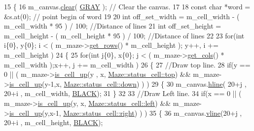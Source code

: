 \begin{DoxyCode}
15 \{
16     m\_canvas.\hyperlink{classCanvas_a0205269b201aed71f21b8f613cd66333}{clear}( \hyperlink{render_8cpp_a009fdb656a368e46b7d614e7438b5830}{GRAY} );     \textcolor{comment}{// Clear the canvas.}
17 
18     \textcolor{keyword}{const} \textcolor{keywordtype}{char} *word = &s.at(0); \textcolor{comment}{// point begin of word}
19 
20     \textcolor{keywordtype}{int} off\_set\_width = m\_cell\_width - ( m\_cell\_width * 95 ) / 100;      \textcolor{comment}{//Distance of lines}
21     \textcolor{keywordtype}{int} off\_set\_height = m\_cell\_height - ( m\_cell\_height * 95 ) / 100;   \textcolor{comment}{//Distance of lines}
22 
23     \textcolor{keywordflow}{for}(\textcolor{keywordtype}{int} i\{0\}, y\{0\}; i < ( m\_maze->\hyperlink{classMaze_ac786606a34632b2254b2d27d5f5f0f3f}{get\_rows}() * m\_cell\_height ); y++, i += m\_cell\_height )
24     \{
25         \textcolor{keywordflow}{for}(\textcolor{keywordtype}{int} j\{0\}, x\{0\}; j < ( m\_maze->\hyperlink{classMaze_a8a04cd1335e96a80358181afa164d4c9}{get\_cols}() * m\_cell\_width );x++, j += m\_cell\_width )
26         \{
27             \textcolor{comment}{//Draw top line.}
28             \textcolor{keywordflow}{if}(y == 0 || ( m\_maze->\hyperlink{classMaze_a2b0e69e72d6c3e1037578f057946a21e}{is\_cell\_up}(y , x, 
      \hyperlink{classMaze_a07167e321eac2b67100fb82ecb98f1d1ab28354b543375bfa94dabaeda722927f}{Maze::status\_cell::top}) && m\_maze->\hyperlink{classMaze_a2b0e69e72d6c3e1037578f057946a21e}{is\_cell\_up}(y-1,x,
      \hyperlink{classMaze_a07167e321eac2b67100fb82ecb98f1d1a74e8333ad11685ff3bdae589c8f6e34d}{Maze::status\_cell::down}) ) )
29             \{
30                 m\_canvas.\hyperlink{classCanvas_a3095d5ff2670c5dc9939454198865ceb}{hline}( 20+j , 20+i , m\_cell\_width, \hyperlink{render_8cpp_ada1558ae37a1ddfc6c8b784f809385d4}{BLACK});
31             \}
32 
33             \textcolor{comment}{//Draw Left line.}
34             \textcolor{keywordflow}{if}(x == 0 || ( m\_maze->\hyperlink{classMaze_a2b0e69e72d6c3e1037578f057946a21e}{is\_cell\_up}(y, x, 
      \hyperlink{classMaze_a07167e321eac2b67100fb82ecb98f1d1a811882fecd5c7618d7099ebbd39ea254}{Maze::status\_cell::left}) && m\_maze->\hyperlink{classMaze_a2b0e69e72d6c3e1037578f057946a21e}{is\_cell\_up}(y,x-1,
      \hyperlink{classMaze_a07167e321eac2b67100fb82ecb98f1d1a7c4f29407893c334a6cb7a87bf045c0d}{Maze::status\_cell::right}) ) )
35             \{
36                 m\_canvas.\hyperlink{classCanvas_af81ae19142bc132665e053ce5de15211}{vline}(20+j , 20+i , m\_cell\_height, \hyperlink{render_8cpp_ada1558ae37a1ddfc6c8b784f809385d4}{BLACK});

\end{DoxyCode}
